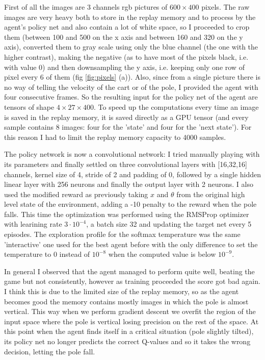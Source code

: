 \documentclass[a4paper, 11pt]{article}
\begin{document}
  First of all the images are 3 channels rgb pictures of $600 \times 400$ pixels. The raw images are very heavy both to store in the replay memory and to process by the agent's policy net and also contain a lot of white space, so I proceeded to crop them (between 100 and 500 on the x axis and between 160 and 320 on the y axis), converted them to gray scale using only the blue channel (the one with the higher contrast), making the negative (as to have most of the pixels black, i.e. with value 0) and then downsampling the y axis, i.e. keeping only one row of pixel every 6 of them (fig \ref{fig:pixels} (a)).
  Also, since from a single picture there is no way of telling the velocity of the cart or of the pole, I provided the agent with four consecutive frames. So the resulting input for the policy net of the agent are tensors of shape $4 \times 27 \times 400$. To speed up the computations every time an image is saved in the replay memory, it is saved directly as a GPU tensor (and every sample contains 8 images: four for the 'state' and four for the 'next state'). For this reason I had to limit the replay memory capacity to 4000 samples.

  The policy network is now a convolutional network: I tried manually playing with its parameters and finally settled on three convolutional layers with [16,32,16] channels, kernel size of 4, stride of 2 and padding of 0, followed by a single hidden linear layer with 256 neurons and finally the output layer with 2 neurons. I also used the modified reward as previously taking $x$ and  $\theta$ from the original high level state of the environment, adding a -10 penalty to the reward when the pole falls. This time the optimization was performed using the RMSProp optimizer with learining rate $3\cdot10^{-4}$, a batch size 32 and updating the target net every 5 episodes. The exploration profile for the softmax temperature was the same 'interactive' one used for the best agent before with the only difference to set the temperature to 0 instead of $10^{-8}$ when the computed value is below $10^{-9}$.

  In general I observed that the agent managed to perform quite well, beating the game but not consistently, however as training proceeded the score got bad again. I think this is due to the limited size of the replay memory, so as the agent becomes good the memory contains mostly images in which the pole is almost vertical. This way when we perform gradient descent we overfit the region of the input space where the pole is vertical losing precision on the rest of the space. At this point when the agent finds itself in a critical situation (pole slightly tilted), its policy net no longer predicts the correct Q-values and so it takes the wrong decision, letting the pole fall.
\end{document}
